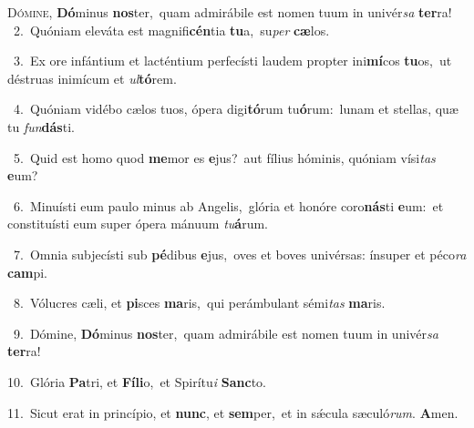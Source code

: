 \lettrine{\initial\textcolor{\initialcolor}{D}}{ómine,} \textbf{Dó}\-minus \textbf{nos}\-ter,~\star quam admirábile est nomen tuum in univér\textit{sa} \textbf{ter}\-ra!\\
{\numbfont\textcolor{\numbcolor}{~2.}}~Quóniam eleváta est magnifi\-\textbf{cén}\-tia \textbf{tu}\-a,~\star su\textit{per} \textbf{cæ}\-los.\par
{\numbfont\textcolor{\numbcolor}{~3.}}~Ex ore infántium et lacténtium perfecísti laudem propter ini\-\textbf{mí}\-cos \textbf{tu}\-os,~\star ut déstruas inimícum et \textit{ul}\-\textbf{tó}rem.\par
{\numbfont\textcolor{\numbcolor}{~4.}}~Quóniam vidébo cælos tuos, ópera digi\-\textbf{tó}\-rum tu\-\textbf{ó}\-rum:~\star lunam et stellas, quæ tu \textit{fun}\-\textbf{dás}ti.\par
{\numbfont\textcolor{\numbcolor}{~5.}}~Quid est homo quod \textbf{me}\-mor es \textbf{e}\-jus?~\star aut fílius hóminis, quóniam vísi\textit{tas} \textbf{e}\-um?\par
{\numbfont\textcolor{\numbcolor}{~6.}}~Minuísti eum paulo minus ab Angelis,~\dagger glória et honóre coro\-\textbf{nás}\-ti \textbf{e}\-um:~\star et constituísti eum super ópera mánuum \textit{tu}\-\textbf{á}rum.\par
{\numbfont\textcolor{\numbcolor}{~7.}}~Omnia subjecísti sub \textbf{pé}\-dibus \textbf{e}\-jus,~\star oves et boves univérsas: ínsuper et péco\textit{ra} \textbf{cam}\-pi.\par
{\numbfont\textcolor{\numbcolor}{~8.}}~Vólucres cæli, et \textbf{pi}\-sces \textbf{ma}\-ris,~\star qui perámbulant sémi\textit{tas} \textbf{ma}\-ris.\par
{\numbfont\textcolor{\numbcolor}{~9.}}~Dómine, \textbf{Dó}\-minus \textbf{nos}\-ter,~\star quam admirábile est nomen tuum in univér\textit{sa} \textbf{ter}\-ra!\par
{\numbfont\textcolor{\numbcolor}{10.}}~Glória \textbf{Pa}\-tri, et \textbf{Fí}\-\textbf{li}o,~\star et Spirítu\textit{i} \textbf{Sanc}\-to.\par
{\numbfont\textcolor{\numbcolor}{11.}}~Sicut erat in princípio, et \textbf{nunc}\-, et \textbf{sem}\-per,~\star et in sǽcula sæculó\-\textit{rum}\-. \textbf{A}\-men.\par
